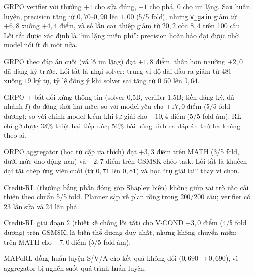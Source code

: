 \documentclass[11pt,a4paper]{article}
\begin{document}
\begin{description}\itemsep5pt
\setlength{\leftmargini}{1.6em}\setlength{\labelsep}{0.5em}
\item[\textbf{Thứ nhất.}] GRPO verifier với thưởng $+1$ cho sửa đúng, $-1$ cho phá, $0$ cho im lặng. Sau huấn luyện, precision tăng từ $0{,}70$--$0{,}90$ lên $1{,}00$ (5/5 fold), nhưng \texttt{V\_gain} giảm từ $+6{,}8$ xuống $+4{,}4$ điểm, và số lần can thiệp giảm từ $20{,}2$ còn $8{,}4$ trên 100 câu. Lối tắt được xác định là “im lặng miễn phí”: precision hoàn hảo đạt được nhờ model nói ít đi một nửa.


\item[\textbf{Thứ hai.}] GRPO theo đáp án cuối (vá lỗ im lặng) đạt $+1{,}8$ điểm, thấp hơn ngưỡng $+2{,}0$ đã đăng ký trước. Lối tắt là nhại solver: trung vị độ dài đầu ra giảm từ $480$ xuống $19$ ký tự, tỷ lệ đồng ý khi solver sai tăng từ $0{,}50$ lên $0{,}64$.

\item[\textbf{Thứ ba.}] GRPO + bất đối xứng thông tin (solver 0,5B, verifier 1,5B; tiền đăng ký, đủ nhánh $I$) đo đồng thời hai mốc: so với model yếu cho $+17{,}0$ điểm (5/5 fold dương); so với chính model kiểm khi tự giải cho $-10{,}4$ điểm (5/5 fold âm). RL chỉ gỡ được 38\% thiệt hại tiếp xúc; 54\% bài hỏng sinh ra đáp án thứ ba không theo ai.

\item[\textbf{Thứ tư.}] ORPO aggregator (học từ cặp ưa thích) đạt $+3{,}3$ điểm trên MATH (3/5 fold, dưới mức dao động nền) và $-2{,}7$ điểm trên GSM8K chéo task. Lối tắt là khuếch đại tật chép ứng viên cuối (từ $0{,}71$ lên $0{,}81$) và học “tự giải lại” thay vì chọn.

\item[\textbf{Thứ năm.}] Credit-RL (thưởng bằng phần đóng góp Shapley biên) không giúp vai trò nào cải thiện theo chuẩn 5/5 fold. Planner sập về plan rỗng trong 200/200 câu; verifier có 23 lần sửa và 24 lần phá.

\item[\textbf{Thứ sáu.}] Credit-RL giai đoạn 2 (thiết kế chống lối tắt) cho V-COND $+3{,}0$ điểm (4/5 fold dương) trên GSM8K, là biến thể dương duy nhất, nhưng không chuyển miền: trên MATH cho $-7{,}0$ điểm (5/5 fold âm).

\item[\textbf{Thứ bảy.}] MAPoRL đồng huấn luyện S/V/A cho kết quả không đổi ($0{,}690 \to 0{,}690$), vì aggregator bị nghẽn suốt quá trình huấn luyện.
\end{description}
\end{document}
